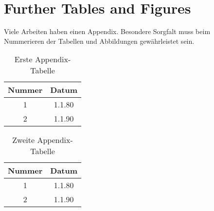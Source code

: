 \documentclass[twoside,12pt,a4paper]{report}
\begin{document}

\cleardoublepage


\cleardoublepage


\appendix

\chapter{Further Tables and Figures}\label{chap:App}
Viele Arbeiten haben einen Appendix. Besondere Sorgfalt muss beim Nummerieren der Tabellen und Abbildungen gewährleistet sein.
\begin{table}[htb]
\begin{tabular}{cc}
Nummer & Datum \\
\hline
1 & 1.1.80\\
2 & 1.1.90 \\
\end{tabular}
\caption{Erste Appendix-Tabelle}\label{tab:app1}
\end{table}


\begin{table}[htb]
\begin{tabular}{cc}
Nummer & Datum \\
\hline
1 & 1.1.80\\
2 & 1.1.90 \\
\end{tabular}
\caption{Zweite Appendix-Tabelle}\label{tab:app2}
\end{table}

\cleardoublepage





\end{document}
